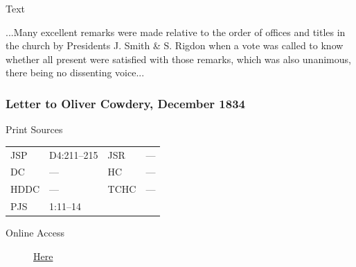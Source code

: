 				
				\begin{description}
					\item[Text]
				\end{description}
				
					...Many excellent remarks were made relative to the order of offices and titles in the church by Presidents J. Smith  \& S. Rigdon when a vote was called to know whether all present were satisfied with those remarks, which was also unanimous, there being no dissenting voice...
					
		\subsubsection{Letter to Oliver Cowdery, December 1834}
			\label{EMS-1834-JS-DEC-1834}
			
			\begin{description}
					\item[Print Sources]
				\end{description}

					\begin{tabular}{p{0.5in}p{1in}p{0.5in}p{1in}}
					JSP	 	& D4:211--215		& JSR 		& --- \\
					DC	 	& --- 		& HC 		& --- \\
					HDDC 	& ---		& TCHC 		& --- \\
					PJS 	& 1:11--14			& 	 		&  \\
					\end{tabular}
				
				\begin{description}
					\item[Online Access] \href{https://www.josephsmithpapers.org/paper-summary/letter-to-oliver-cowdery-december-1834/1}{Here}
				\end{description}
				
